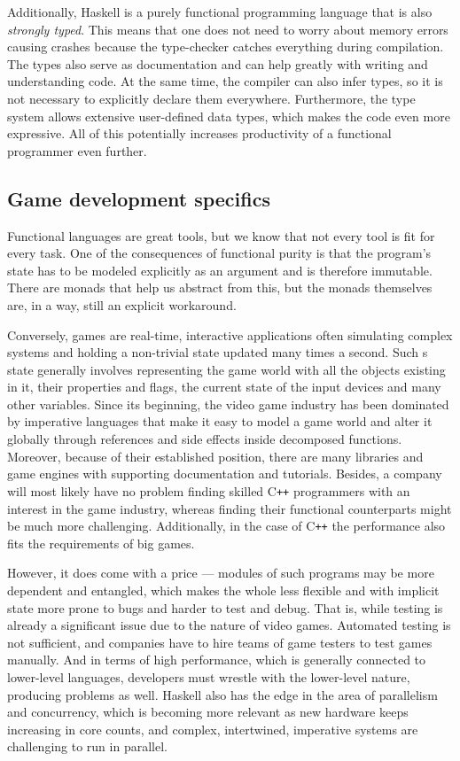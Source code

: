 \documentclass[
  digital, %
  color,   %
  table,   %
  oneside, %
  lof,     %
  lot,     %
]{fithesis3}
\newcommand{\cpp}{C\nolinebreak\texttt{+}\nolinebreak\texttt{+}}
\begin{document}
Additionally, Haskell is a purely functional programming language that
is also \emph{strongly typed}. This means that one
does not need to worry about memory errors causing crashes because
the type-checker catches everything during compilation.
The types also serve as documentation and can help greatly
with writing and understanding code. At the same time,
the compiler can also infer types, so it
is not necessary to explicitly declare them everywhere.
Furthermore, the type system allows extensive user-defined data types,
which makes the code even more expressive.
All of this potentially increases productivity of a functional programmer even further.


\subsection{Game development specifics}
Functional languages are great tools, but we know that not every tool is
fit for every task. One of the consequences of functional purity is
that the program's state has to be modeled explicitly as an argument
and is therefore immutable. There are monads that help us abstract
from this, but the monads themselves are, in a way, still an explicit workaround.

Conversely, games are real-time, interactive applications often simulating
complex systems and holding a non-trivial state updated many times a second.
Such s state generally involves representing
the game world with all the objects existing in it, their properties and flags,
the current state of the input devices and many other variables. Since its beginning,
the video game industry has been dominated by imperative languages
that make it easy to model a game world and alter it globally through
references and side effects inside decomposed functions. Moreover, because
of their established position, there are many libraries and game engines
with supporting documentation and tutorials. Besides, a company will most likely
have no problem finding skilled \cpp{} programmers with an interest
in the game industry, whereas finding their functional counterparts
might be much more challenging. Additionally, in the case of \cpp{} the performance
also fits the requirements of big games.

However, it does come with a price --- modules of such programs may be
more dependent and entangled, which makes the whole less flexible and with
implicit state more prone to bugs and harder to test and debug.
That is, while testing is already a significant issue due to the nature of video games.
Automated testing is not sufficient, and companies have to hire teams
of game testers to test games manually. And in terms of high performance,
which is generally connected to lower-level languages, developers must
wrestle with the lower-level nature, producing problems as well.
Haskell also has the edge in the area of parallelism and concurrency,
which is becoming more relevant as new hardware keeps increasing in core counts,
and complex, intertwined, imperative systems are challenging to run in parallel.
\end{document}

